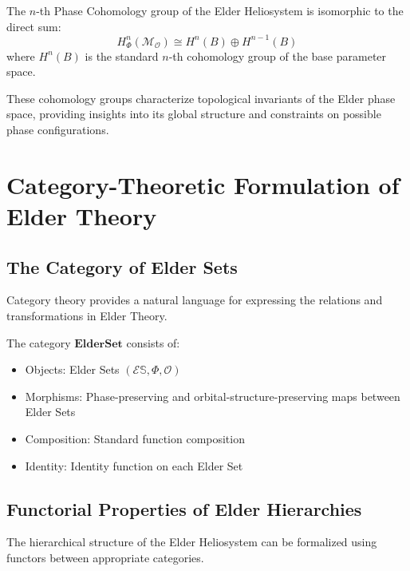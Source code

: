 \begin{theorem}
The $n$-th Phase Cohomology group of the Elder Heliosystem is isomorphic to the direct sum:
\begin{equation}
H^n_{\Phi}(\mathcal{M}_{\mathcal{O}}) \cong H^n(B) \oplus H^{n-1}(B)
\end{equation}
where $H^n(B)$ is the standard $n$-th cohomology group of the base parameter space.
\end{theorem}

These cohomology groups characterize topological invariants of the Elder phase space, providing insights into its global structure and constraints on possible phase configurations.

\section{Category-Theoretic Formulation of Elder Theory}

\subsection{The Category of Elder Sets}

Category theory provides a natural language for expressing the relations and transformations in Elder Theory.

\begin{definition}
The category $\mathbf{ElderSet}$ consists of:
\begin{itemize}
    \item Objects: Elder Sets $(\mathcal{E}\mathbb{S}, \Phi, \mathcal{O})$
    \item Morphisms: Phase-preserving and orbital-structure-preserving maps between Elder Sets
    \item Composition: Standard function composition
    \item Identity: Identity function on each Elder Set
\end{itemize}
\end{definition}

\subsection{Functorial Properties of Elder Hierarchies}

The hierarchical structure of the Elder Heliosystem can be formalized using functors between appropriate categories.

